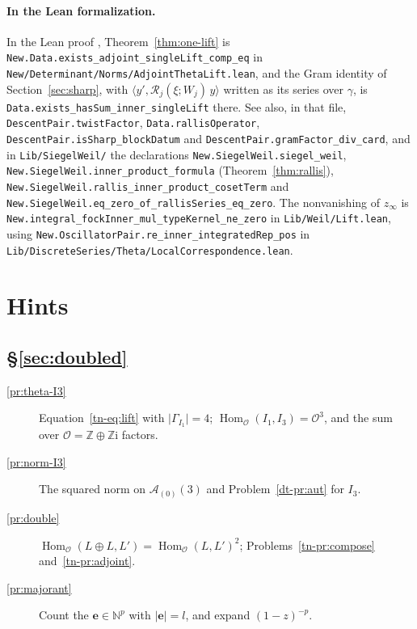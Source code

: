 \documentclass[reqno]{amsart}
\theoremstyle{definition}
\theoremstyle{plain}
\newcommand{\Z}{\mathbb{Z}}
\newcommand{\ii}{\mathrm{i}}
\newcommand{\Oc}{\mathcal{O}}
\newcommand{\Ac}{\mathcal{A}}
\newcommand{\Rc}{\mathcal{R}}
\newcommand{\Hom}{\operatorname{Hom}}
\begin{document}
\paragraph{In the Lean formalization.}
\begin{sloppypar}
In the Lean proof \cite{GL}, Theorem~\ref{thm:one-lift} is \texttt{New.Data.exists\_\allowbreak adjoint\_\allowbreak singleLift\_\allowbreak comp\_\allowbreak eq} in \texttt{New/\allowbreak Determinant/\allowbreak Norms/\allowbreak AdjointThetaLift.lean}, and the Gram identity of Section~\ref{sec:sharp}, with \(\langle y', \Rc_j(\xi; W_j)\, y\rangle\) written as its series over \(\gamma\), is \texttt{Data.\allowbreak exists\_\allowbreak hasSum\_\allowbreak inner\_\allowbreak singleLift} there.  See also, in that file, \texttt{DescentPair.\allowbreak twistFactor}, \texttt{Data.\allowbreak rallisOperator}, \texttt{DescentPair.\allowbreak isSharp\_\allowbreak blockDatum} and \texttt{DescentPair.\allowbreak gramFactor\_\allowbreak div\_\allowbreak card}, and in \texttt{Lib/\allowbreak SiegelWeil/} the declarations \texttt{New.\allowbreak SiegelWeil.\allowbreak siegel\_\allowbreak weil}, \texttt{New.\allowbreak SiegelWeil.\allowbreak inner\_\allowbreak product\_\allowbreak formula} (Theorem~\ref{thm:rallis}), \texttt{New.\allowbreak SiegelWeil.\allowbreak rallis\_\allowbreak inner\_\allowbreak product\_\allowbreak cosetTerm} and \texttt{New.\allowbreak SiegelWeil.\allowbreak eq\_\allowbreak zero\_\allowbreak of\_\allowbreak rallisSeries\_\allowbreak eq\_\allowbreak zero}.  The nonvanishing of \(z_\infty\) is \texttt{New.integral\_\allowbreak fockInner\_\allowbreak mul\_\allowbreak typeKernel\_\allowbreak ne\_\allowbreak zero} in \texttt{Lib/Weil/Lift.lean}, using \texttt{New.OscillatorPair.re\_\allowbreak inner\_\allowbreak integratedRep\_\allowbreak pos} in \texttt{Lib/DiscreteSeries/Theta/LocalCorrespondence.lean}.
\end{sloppypar}

\section*{Hints}

\subsection*{\S\ref{sec:doubled}}
\begin{description}
\item[\ref{pr:theta-I3}] Equation~\eqref{tn-eq:lift} with \(\lvert\Gamma_{I_1}\rvert = 4\); \(\Hom_\Oc(I_1, I_3) = \Oc^3\), and the sum over \(\Oc = \Z \oplus \Z\ii\) factors.
\item[\ref{pr:norm-I3}] The squared norm on \(\Ac_{(0)}(3)\) and Problem~\ref{dt-pr:aut} for \(I_3\).
\item[\ref{pr:double}] \(\Hom_\Oc(L \oplus L, L') = \Hom_\Oc(L, L')^2\); Problems~\ref{tn-pr:compose} and~\ref{tn-pr:adjoint}.
\item[\ref{pr:majorant}] Count the \(\mathbf e \in \mathbb N^p\) with \(\lvert\mathbf e\rvert = l\), and expand \((1 - z)^{-p}\).
\end{description}
\end{document}
